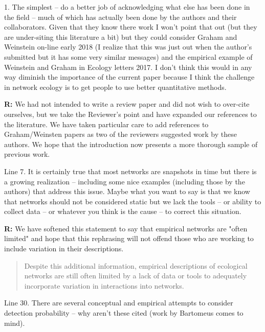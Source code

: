 \documentclass[12pt]{letter}
\newenvironment{refquote}{\bigskip \begin{it}}{\end{it}\smallskip}
\begin{document}
\begin{itemize}
		\begin{refquote}
		1.      The simplest – do a better job of acknowledging what else has been done in the field – much of which has actually been done by the authors and their collaborators.  Given that they know there work I won’t point that out (but they are under-siting this literature a bit) but they could consider Graham and Weinstein on-line early 2018 (I realize that this was just out when the author’s submitted but it has some very similar messages) and the empirical example of Weinstein and Graham in Ecology letters 2017.  I don’t think this would in any way diminish the importance of the current paper because I think the challenge in network ecology is to get people to use better quantitative methods.
		\end{refquote}

		\textbf{R:} We had not intended to write a review paper and did not wish to over-cite ourselves, but we take the Reviewer's point and have expanded our references to the literature. We have taken particular care to add references to Graham/Weinsten papers as two of the reviewers suggested work by these authors. We hope that the introduction now presents a more thorough sample of previous work.

		\begin{refquote}
		Line 7.  It is certainly true that most networks are snapshots in time but there is a growing realization – including some nice examples (including those by the authors) that address this issue.  Maybe what you want to say is that we know that networks should not be considered static but we lack the tools – or ability to collect data – or whatever you think is the cause – to correct this situation. 
		\end{refquote}

		\textbf{R:} We have softened this statement to say that empirical networks are "often limited" and hope that this rephrasing will not offend those who are working to include variation in their descriptions.

			\begin{quotation}
				Despite this additional information, empirical descriptions of ecological networks are still often limited by a lack of data or tools to adequately incorporate variation in interactions into networks.
			\end{quotation}


		\begin{refquote}
		Line 30.  There are several conceptual and empirical attempts to consider detection probability – why aren’t these cited (work by Bartomeus comes to mind).\\
		\end{refquote}


\end{itemize}
\end{document}
